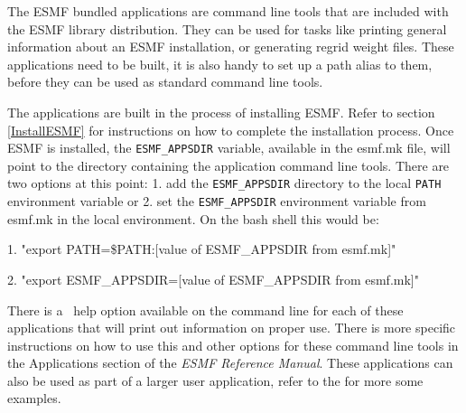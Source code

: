 
The ESMF bundled applications are command line tools that are included
with the ESMF library distribution.  They can be used for tasks like
printing general information about an ESMF installation, or generating
regrid weight files.  These applications need to be built, it is also
handy to set up a path alias to them, before they 
can be used as standard command line tools.

The applications are built in the process of installing ESMF.  Refer 
to section \ref{InstallESMF} for instructions on how to complete the 
installation process.  Once ESMF is installed, the {\tt ESMF\_APPSDIR} 
variable, available in the esmf.mk file,
will point to the directory containing the application command line 
tools.  There are two options at this point: 1. add the {\tt ESMF\_APPSDIR}
directory to the local {\tt PATH} environment variable or 2. set the 
{\tt ESMF\_APPSDIR} environment variable from esmf.mk in the local 
environment.  On the bash shell this would be:

1. "export PATH=\$PATH:[value of ESMF\_APPSDIR from esmf.mk]"

2. "export ESMF\_APPSDIR=[value of ESMF\_APPSDIR from esmf.mk]"

There is a \-~\-help option available on the command line for each 
of these applications that will print out information on proper use.  
There is more specific instructions on how to use
this and other options for these command line tools in the Applications section
of the {\it ESMF Reference Manual}.  These applications can
also be used as part of a larger user application, refer to the 
for more some examples.  
